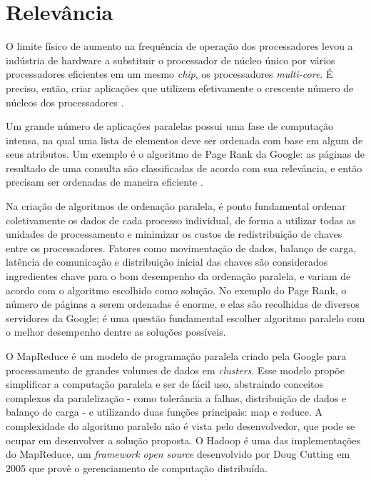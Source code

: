\section{Relevância}



O limite físico de aumento na frequência de operação dos processadores levou a indústria de hardware a substituir o processador de núcleo único por vários processadores eficientes em um mesmo \textit{chip}, os processadores \textit{multi-core}. 
É preciso, então, criar aplicações que utilizem efetivamente o crescente número de núcleos dos processadores  \cite{Asanovic:2009}.



Um grande número de aplicações paralelas possui uma fase de computação intensa, na qual uma lista de elementos deve ser ordenada com base em algum de seus atributos. Um exemplo é o algoritmo de Page Rank \cite{PageRank:1999} da Google: as páginas de resultado de uma consulta são classificadas de acordo com sua relevância, e então precisam ser ordenadas de maneira eficiente \cite{Kale:2010}.

Na criação de algoritmos de ordenação paralela, é ponto fundamental ordenar coletivamente os dados de cada processo individual, de forma a utilizar todas as unidades de processamento e minimizar os custos de redistribuição de chaves entre os processadores. Fatores como movimentação de dados, balanço de carga, latência de comunicação e distribuição inicial das chaves são considerados ingredientes chave para o bom desempenho da ordenação paralela, e variam de acordo com o algoritmo escolhido como solução\cite{Kale:2010}. 
No exemplo do Page Rank, o número de páginas a serem ordenadas é enorme, e elas são recolhidas de diversos servidores da Google; é uma questão fundamental escolher algoritmo paralelo com o melhor desempenho dentre as soluções possíveis.


O MapReduce\cite{Dean:2008}  é um modelo de programação paralela criado pela Google para processamento de grandes volumes de dados em \textit{clusters}. Esse modelo propõe simplificar a computação paralela e ser de fácil uso, abstraindo conceitos complexos da paralelização - como tolerância a falhas, distribuição de dados e balanço de carga - e utilizando duas funções principais: map e reduce. A complexidade do algoritmo paralelo não é vista pelo desenvolvedor, que pode se ocupar em desenvolver a solução proposta. O Hadoop \cite{Hadoop:2010} é uma das implementações do MapReduce, um \textit{framework open source } desenvolvido por Doug Cutting em 2005 que provê o gerenciamento de computação distribuída. %

